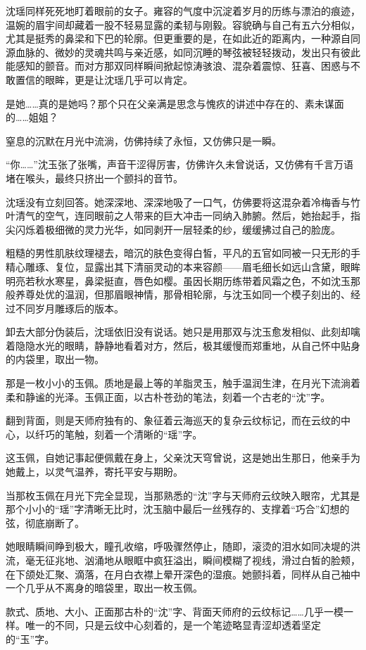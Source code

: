 沈瑶同样死死地盯着眼前的女子。雍容的气度中沉淀着岁月的历练与漂泊的痕迹，温婉的眉宇间却藏着一股不轻易显露的柔韧与刚毅。容貌确与自己有五六分相似，尤其是挺秀的鼻梁和下巴的轮廓。但更重要的是，在如此近的距离内，一种源自同源血脉的、微妙的灵魂共鸣与亲近感，如同沉睡的琴弦被轻轻拨动，发出只有彼此能感知的颤音。而对方那双同样瞬间掀起惊涛骇浪、混杂着震惊、狂喜、困惑与不敢置信的眼眸，更是让沈瑶几乎可以肯定。

是她……真的是她吗？那个只在父亲满是思念与愧疚的讲述中存在的、素未谋面的……姐姐？

窒息的沉默在月光中流淌，仿佛持续了永恒，又仿佛只是一瞬。

“你……”沈玉张了张嘴，声音干涩得厉害，仿佛许久未曾说话，又仿佛有千言万语堵在喉头，最终只挤出一个颤抖的音节。

沈瑶没有立刻回答。她深深地、深深地吸了一口气，仿佛要将这混杂着冷梅香与竹叶清气的空气，连同眼前之人带来的巨大冲击一同纳入肺腑。然后，她抬起手，指尖闪烁着极细微的灵力光华，如同剥开一层轻柔的纱，缓缓拂过自己的脸庞。

粗糙的男性肌肤纹理褪去，暗沉的肤色变得白皙，平凡的五官如同被一只无形的手精心雕琢、复位，显露出其下清丽灵动的本来容颜——眉毛细长如远山含黛，眼眸明亮若秋水寒星，鼻梁挺直，唇色如樱。虽因长期历练带着风霜之色，不如沈玉那般养尊处优的温润，但那眉眼神情，那骨相轮廓，与沈玉如同一个模子刻出的、经过不同岁月雕琢后的版本。

卸去大部分伪装后，沈瑶依旧没有说话。她只是用那双与沈玉愈发相似、此刻却噙着隐隐水光的眼睛，静静地看着对方，然后，极其缓慢而郑重地，从自己怀中贴身的内袋里，取出一物。

那是一枚小小的玉佩。质地是最上等的羊脂灵玉，触手温润生津，在月光下流淌着柔和静谧的光泽。玉佩正面，以古朴苍劲的笔法，刻着一个古老的“沈”字。

翻到背面，则是天师府独有的、象征着云海巡天的复杂云纹标记，而在云纹的中心，以纤巧的笔触，刻着一个清晰的“瑶”字。

这玉佩，自她记事起便佩戴在身上，父亲沈天穹曾说，这是她出生那日，他亲手为她戴上，以灵气温养，寄托平安与期盼。

当那枚玉佩在月光下完全显现，当那熟悉的“沈”字与天师府云纹映入眼帘，尤其是那个小小的“瑶”字清晰无比时，沈玉脑中最后一丝残存的、支撑着“巧合”幻想的弦，彻底崩断了。

她眼睛瞬间睁到极大，瞳孔收缩，呼吸骤然停止，随即，滚烫的泪水如同决堤的洪流，毫无征兆地、汹涌地从眼眶中疯狂溢出，瞬间模糊了视线，滑过白皙的脸颊，在下颌处汇聚、滴落，在月白衣襟上晕开深色的湿痕。她颤抖着，同样从自己袖中一个几乎从不离身的暗袋里，取出一枚玉佩。

款式、质地、大小、正面那古朴的“沈”字、背面天师府的云纹标记……几乎一模一样。唯一的不同，只是云纹中心刻着的，是一个笔迹略显青涩却透着坚定的“玉”字。

